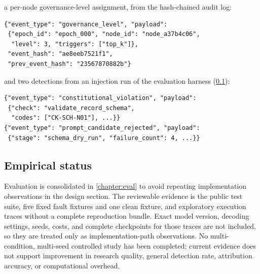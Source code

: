 \noindent
a per-node governance-level assignment, from the hash-chained audit
log:

\begin{Verbatim}[breaklines, fontsize=\scriptsize]
{"event_type": "governance_level", "payload":
 {"epoch_id": "epoch_000", "node_id": "node_a37b4c06",
  "level": 3, "triggers": ["top_k"]},
 "event_hash": "ae8eeb7521f1",
 "prev_event_hash": "23567870882b"}
\end{Verbatim}

\noindent
and two detections from an injection run of the evaluation harness
(\cref{sec:rqgm:empirical}):

\begin{Verbatim}[breaklines, fontsize=\scriptsize]
{"event_type": "constitutional_violation", "payload":
 {"check": "validate_record_schema",
  "codes": ["CK-SCH-N01"], ...}}
{"event_type": "prompt_candidate_rejected", "payload":
 {"stage": "schema_dry_run", "failure_count": 4, ...}}
\end{Verbatim}

\subsection{Empirical status}\label{sec:rqgm:empirical}

Evaluation is consolidated in \cref{chapter:eval} to avoid repeating
implementation observations in the design section. The reviewable
evidence is the public test suite, five fixed fault fixtures and one clean
fixture, and exploratory execution traces without a complete
reproduction bundle. Exact model version, decoding settings, seeds,
costs, and complete checkpoints for those traces are not included, so
they are treated only as implementation-path observations. No
multi-condition, multi-seed controlled study has been completed; current
evidence does not support improvement in research quality, general
detection rate, attribution accuracy, or computational overhead.
